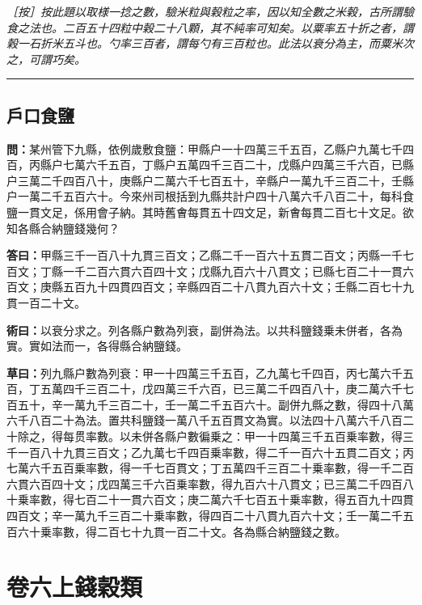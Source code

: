 \documentclass[11pt,a4paper]{article}
\newcommand{\longline}{\noindent\rule{\textwidth}{0.4pt}}
\newcommand{\Question}[1]{\par\noindent\textbf{\color{problemcolor}問：}#1\par}
\newcommand{\Answer}[1]{\par\noindent\textbf{\color{answercolor}答曰：}#1\par}
\newcommand{\Method}[1]{\par\noindent\textbf{\color{methodcolor}術曰：}#1\par}
\newcommand{\Working}[1]{\par\noindent\textbf{草曰：}#1\par}
\newcommand{\EditorialNote}[1]{\par\noindent\textit{［按］#1}\par}
\begin{document}
\EditorialNote{按此題以取様一捻之數，驗米粒與榖粒之率，因以知全數之米榖，古所謂驗食之法也。二百五十四粒中榖二十八顆，其不純率可知矣。以粟率五十折之者，謂榖一石折米五斗也。勺率三百者，謂每勺有三百粒也。此法以衰分為主，而粟米次之，可謂巧矣。}

\longline

\subsection*{\color{sectioncolor}戶口食鹽}

\Question{某州管下九縣，依例歲敷食鹽：甲縣户一十四萬三千五百，乙縣户九萬七千四百，丙縣户七萬六千五百，丁縣户五萬四千三百二十，戊縣户四萬三千六百，已縣户三萬二千四百八十，庚縣户二萬六千七百五十，辛縣户一萬九千三百二十，壬縣户一萬二千五百六十。今來州司根括到九縣共計户四十八萬六千八百二十，每科食鹽一貫文足，係用會子納。其時舊㑹每貫五十四文足，新㑹每貫二百七十文足。欲知各縣合納鹽錢幾何？}

\Answer{甲縣三千一百八十九貫三百文；乙縣二千一百六十五貫二百文；丙縣一千七百文；丁縣一千二百六貫六百四十文；戊縣九百六十八貫文；已縣七百二十一貫六百文；庚縣五百九十四貫四百文；辛縣四百二十八貫九百六十文；壬縣二百七十九貫一百二十文。}

\Method{以衰分求之。列各縣户數為列衰，副併為法。以共科鹽錢乗未併者，各為實。實如法而一，各得縣合納鹽錢。}

\Working{列九縣户數為列衰：甲一十四萬三千五百，乙九萬七千四百，丙七萬六千五百，丁五萬四千三百二十，戊四萬三千六百，已三萬二千四百八十，庚二萬六千七百五十，辛一萬九千三百二十，壬一萬二千五百六十。副併九縣之數，得四十八萬六千八百二十為法。置共科鹽錢一萬八千五百貫文為實。以法四十八萬六千八百二十除之，得每贯率數。以未併各縣户數徧乗之：甲一十四萬三千五百乗率數，得三千一百八十九貫三百文；乙九萬七千四百乗率數，得二千一百六十五貫二百文；丙七萬六千五百乗率數，得一千七百貫文；丁五萬四千三百二十乗率數，得一千二百六貫六百四十文；戊四萬三千六百乗率數，得九百六十八貫文；已三萬二千四百八十乗率數，得七百二十一貫六百文；庚二萬六千七百五十乗率數，得五百九十四貫四百文；辛一萬九千三百二十乗率數，得四百二十八貫九百六十文；壬一萬二千五百六十乗率數，得二百七十九貫一百二十文。各為縣合納鹽錢之數。}


\newpage
\section*{\color{titlecolor}卷六上\quad 錢穀類}
\end{document}
